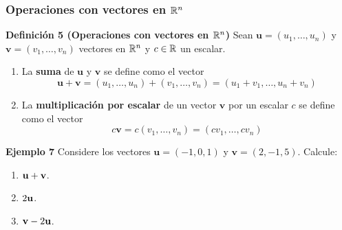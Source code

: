 {\nologo
\begin{frame}\frametitle{Operaciones con vectores en $\mathbb{R}^n$}

\begin{block}{\textbf{Definición 5 (Operaciones con vectores en $\mathbb{R}^n$)}}
	\justifying
	Sean $\mathbf{u}=(u_1,\hdots,u_n)$ y $\mathbf{v}=(v_1,\hdots,v_n)$ vectores en $\mathbb{R}^n$ y $c\in\mathbb{R}$ un escalar.
	\begin{enumerate}
		\item La \textbf{suma} de $\mathbf{u}$ y $\mathbf{v}$ se define como el vector
		\[
		\mathbf{u+v} = (u_1,\hdots,u_n) + (v_1,\hdots,v_n) = (u_1+v_1,\hdots,u_n+v_n)
		\]
		\item La \textbf{multiplicación por escalar} de un vector $\mathbf{v}$ por un escalar $c$ se define como el vector
		\[
		c\mathbf{v} = c(v_1,\hdots,v_n) = (cv_1,\hdots,cv_n)
		\]	
	\end{enumerate}
\end{block}

\begin{ej}{\textbf{Ejemplo 7}}
	Considere los vectores $\mathbf{u}=(-1,0,1)$ y $\mathbf{v}=(2,-1,5)$. Calcule:
	
	\vspace{-2mm}
	\begin{multicols}{3}
		\begin{enumerate}
			\item[\labelname{$a$}] $\mathbf{u}+\mathbf{v}$.
			\item[\labelname{$b$}] $2\mathbf{u}$.
			\item[\labelname{$c$}] $\mathbf{v}-2\mathbf{u}$.
		\end{enumerate}
	\end{multicols}
	
	\vspace{-2mm}
\end{ej}

\end{frame}
}


\subsection{} 


